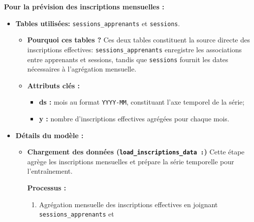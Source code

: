 \vspace{0.3cm}
\noindent\textbf{Pour la prévision des inscriptions mensuelles :}
 \begin{itemize}[label=\textbullet]
    \item \textbf{Tables utilisées:} \texttt{sessions\_apprenants} et \texttt{sessions}.
    \begin{itemize}
        \item \textbf{Pourquoi ces tables ?} Ces deux tables constituent la source 
directe des inscriptions effectives: \texttt{sessions\_apprenants} 
enregistre les associations entre apprenants et sessions, tandis que 
\texttt{sessions} fournit les dates nécessaires à l'agrégation mensuelle.
        \item  \textbf{Attributs clés :}
\begin{itemize}[label=\textbullet]
    \item \textbf{ds :} mois au format \texttt{YYYY-MM}, constituant 
    l'axe temporel de la série;
    \item \textbf{y :} nombre d'inscriptions effectives agrégées 
    pour chaque mois.
\end{itemize}
    \end{itemize} 
    \item  
\textbf{Détails du modèle :}

\begin{itemize}[label=\textbullet]

    \item \textbf{Chargement des données 
    (\texttt{load\_inscriptions\_data :})} Cette étape agrège 
    les inscriptions mensuelles et prépare la série temporelle 
    pour l'entraînement.

    \textbf{Processus :}
    \begin{enumerate}
        \item Agrégation mensuelle des inscriptions effectives 
        en joignant \texttt{sessions\_apprenants} et 


\end{enumerate}
\end{itemize}
\end{itemize}
